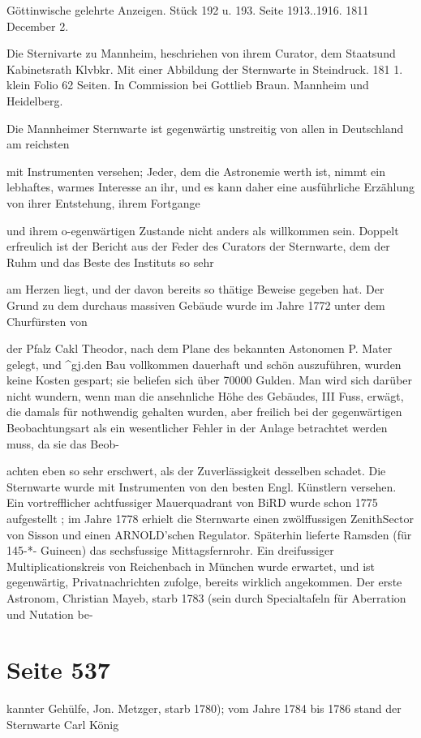 \documentclass[10pt,a4paper]{article}
\begin{document}
Göttinwische gelehrte Anzeigen. Stück 192 u. 193. Seite 1913..1916. 1811 December 2.

Die Sternivarte zu Mannheim, heschriehen von ihrem Curator, dem Staatsund Kabinetsrath Klvbkr. Mit einer Abbildung der Sternwarte in Steindruck. 181 1. klein Folio 62 Seiten. In Commission bei Gottlieb Braun. Mannheim und Heidelberg.

Die Mannheimer Sternwarte ist gegenwärtig unstreitig von allen in Deutschland am reichsten

mit Instrumenten versehen; Jeder, dem die Astronemie werth ist, nimmt ein lebhaftes, warmes Interesse an ihr, und es kann daher eine ausführliche Erzählung von ihrer Entstehung, ihrem Fortgange

und ihrem o-egenwärtigen Zustande nicht anders als willkommen sein. Doppelt erfreulich ist der Bericht aus der Feder des Curators der Sternwarte, dem der Ruhm und das Beste des Instituts so sehr

am Herzen liegt, und der davon bereits so thätige Beweise gegeben hat. Der Grund zu dem durchaus massiven Gebäude wurde im Jahre 1772 unter dem Churfürsten von

der Pfalz Cakl Theodor, nach dem Plane des bekannten Astonomen P. Mater gelegt, und \textasciicircum{}gj.den Bau vollkommen dauerhaft und schön auszuführen, wurden keine Kosten gespart; sie beliefen sich über 70000 Gulden. Man wird sich darüber nicht wundern, wenn man die ansehnliche Höhe des Gebäudes, III Fuss, erwägt, die damals für nothwendig gehalten wurden, aber freilich bei der gegenwärtigen Beobachtungsart als ein wesentlicher Fehler in der Anlage betrachtet werden muss, da sie das Beob-

achten eben so sehr erschwert, als der Zuverlässigkeit desselben schadet. Die Sternwarte wurde mit Instrumenten von den besten Engl. Künstlern versehen. Ein vortrefflicher achtfussiger Mauerquadrant von BiRD wurde schon 1775 aufgestellt ; im Jahre 1778 erhielt die Sternwarte einen zwölffussigen ZenithSector von Sisson und einen ARNOLD'schen Regulator. Späterhin lieferte Ramsden (für 145-*- Guineen) das sechsfussige Mittagsfernrohr. Ein dreifussiger Multiplicationskreis von Reichenbach in München wurde erwartet, und ist gegenwärtig, Privatnachrichten zufolge, bereits wirklich angekommen. Der erste Astronom, Christian Mayeb, starb 1783 (sein durch Specialtafeln für Aberration und Nutation be-


\newpage
\section*{Seite 537}
kannter Gehülfe, Jon. Metzger, starb 1780); vom Jahre 1784 bis 1786 stand der Sternwarte Carl König
\end{document}
